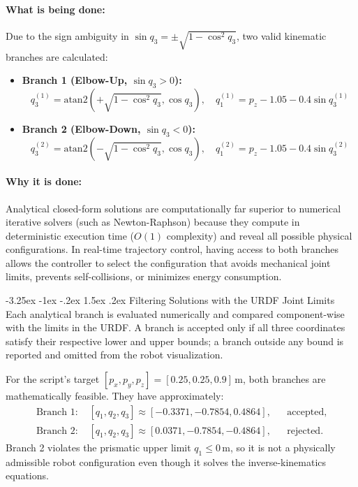 \documentclass[11pt, a4paper]{article}
\makeatletter
\renewcommand{\subsection}{\@startsection{subsection}{2}{\z@}%
    {-3.25ex \@plus -1ex \@minus -.2ex}%
    {1.5ex \@plus .2ex}%
    {\normalfont\large\bfseries\color{brandaccent}}}
\makeatother
\begin{document}
\paragraph{What is being done:}
Due to the sign ambiguity in $\sin q_3 = \pm \sqrt{1 - \cos^2 q_3}$, two valid kinematic branches are calculated:
\begin{itemize}[leftmargin=1.5em]
    \item \textbf{Branch 1 (Elbow-Up, $\sin q_3 > 0$):}
    \begin{equation}
        q_3^{(1)} = \text{atan2}\left(+\sqrt{1 - \cos^2 q_3}, \cos q_3\right), \quad q_1^{(1)} = p_z - 1.05 - 0.4 \sin q_3^{(1)}
    \end{equation}
    \item \textbf{Branch 2 (Elbow-Down, $\sin q_3 < 0$):}
    \begin{equation}
        q_3^{(2)} = \text{atan2}\left(-\sqrt{1 - \cos^2 q_3}, \cos q_3\right), \quad q_1^{(2)} = p_z - 1.05 - 0.4 \sin q_3^{(2)}
    \end{equation}
\end{itemize}

\paragraph{Why it is done:}
Analytical closed-form solutions are computationally far superior to numerical iterative solvers (such as Newton-Raphson) because they compute in deterministic execution time ($O(1)$ complexity) and reveal all possible physical configurations. In real-time trajectory control, having access to both branches allows the controller to select the configuration that avoids mechanical joint limits, prevents self-collisions, or minimizes energy consumption.

\subsection{Filtering Solutions with the URDF Joint Limits}
Each analytical branch is evaluated numerically and compared component-wise with the limits in the URDF. A branch is accepted only if all three coordinates satisfy their respective lower and upper bounds; a branch outside any bound is reported and omitted from the robot visualization.

For the script's target $[p_x,p_y,p_z]=[0.25,0.25,0.9]\,\mathrm{m}$, both branches are mathematically feasible. They have approximately:
\begin{align*}
\text{Branch 1: } &[q_1,q_2,q_3] \approx [-0.3371,-0.7854,0.4864], &&\text{accepted},\\
\text{Branch 2: } &[q_1,q_2,q_3] \approx [0.0371,-0.7854,-0.4864], &&\text{rejected}.
\end{align*}
Branch 2 violates the prismatic upper limit $q_1\leq 0\,\mathrm{m}$, so it is not a physically admissible robot configuration even though it solves the inverse-kinematics equations.
\end{document}
